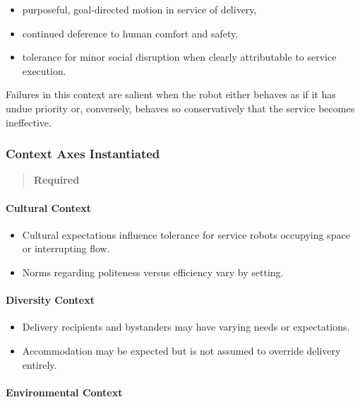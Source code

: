 \documentclass[utf8]{frontiers_suppmat} %
\providecommand{\tightlist}{%
  \setlength{\itemsep}{0pt}\setlength{\parskip}{0pt}}
\begin{document}
\begin{itemize}
\tightlist
\item
  purposeful, goal-directed motion in service of delivery,
\item
  continued deference to human comfort and safety,
\item
  tolerance for minor social disruption when clearly attributable to
  service execution.
\end{itemize}

Failures in this context are salient when the robot either behaves as if
it has undue priority or, conversely, behaves so conservatively that the
service becomes ineffective.

\subsubsection{Context Axes
Instantiated}\label{context-axes-instantiated}

\begin{quote}
\textbf{Required}
\end{quote}

\paragraph{Cultural Context}\label{cultural-context}

\begin{itemize}
\tightlist
\item
  Cultural expectations influence tolerance for service robots occupying
  space or interrupting flow.
\item
  Norms regarding politeness versus efficiency vary by setting.
\end{itemize}

\paragraph{Diversity Context}\label{diversity-context}

\begin{itemize}
\tightlist
\item
  Delivery recipients and bystanders may have varying needs or
  expectations.
\item
  Accommodation may be expected but is not assumed to override delivery
  entirely.
\end{itemize}

\paragraph{Environmental Context}\label{environmental-context}
\end{document}
